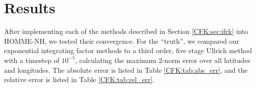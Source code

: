 \documentclass{csri19}
\begin{document}
\section{Results}\label{CFK:sec:results}
After implementing each of the methods described in Section 
\ref{CFK:sec:ifrk} into HOMME-NH, we tested their convergence. For the 
``truth'', we compared our exponential integrating factor methods to a 
third order, five stage Ullrich method with a timestep of $10^{-5}$, 
calculating the maximum $2$-norm error over all latitudes and longitudes. 
The absolute error is listed in Table \ref{CFK:tab:abs_err}, and the 
relative error is listed in Table \ref{CFK:tab:rel_err}.

\begin{table}[hb]
  \centering
  \caption{Absolute error of state variables}
  \label{CFK:tab:abs_err}
  \qquad
\end{table}
\end{document}
